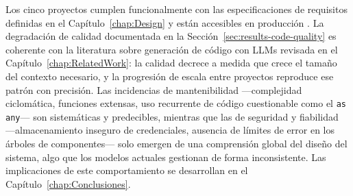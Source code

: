 Los cinco proyectos cumplen funcionalmente con las especificaciones de requisitos definidas en el Capítulo~\ref{chap:Design} y están accesibles en producción \cite{URL::TFG-Web}. La degradación de calidad documentada en la Sección~\ref{sec:results-code-quality} es coherente con la literatura sobre generación de código con \ac{LLMs} revisada en el Capítulo~\ref{chap:RelatedWork}: la calidad decrece a medida que crece el tamaño del contexto necesario, y la progresión de escala entre proyectos reproduce ese patrón con precisión. Las incidencias de mantenibilidad —complejidad ciclomática, funciones extensas, uso recurrente de código cuestionable como el \texttt{as any}— son sistemáticas y predecibles, mientras que las de seguridad y fiabilidad —almacenamiento inseguro de credenciales, ausencia de límites de error en los árboles de componentes— solo emergen de una comprensión global del diseño del sistema, algo que los modelos actuales gestionan de forma inconsistente. Las implicaciones de este comportamiento se desarrollan en el Capítulo~\ref{chap:Conclusiones}.
